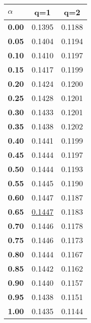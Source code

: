 \begin{tabular}{ | l || c | c |}
\hline
\textbf{$\alpha$} & \textbf{}q=1} & \textbf{}q=2} \\
\hline
\textbf{0.00} & 0.1395 & 0.1188\\
\hline
\textbf{0.05} & 0.1404 & 0.1194\\
\hline
\textbf{0.10} & 0.1410 & 0.1197\\
\hline
\textbf{0.15} & 0.1417 & 0.1199\\
\hline
\textbf{0.20} & 0.1424 & 0.1200\\
\hline
\textbf{0.25} & 0.1428 & 0.1201\\
\hline
\textbf{0.30} & 0.1433 & 0.1201\\
\hline
\textbf{0.35} & 0.1438 & 0.1202\\
\hline
\textbf{0.40} & 0.1441 & 0.1199\\
\hline
\textbf{0.45} & 0.1444 & 0.1197\\
\hline
\textbf{0.50} & 0.1444 & 0.1193\\
\hline
\textbf{0.55} & 0.1445 & 0.1190\\
\hline
\textbf{0.60} & 0.1447 & 0.1187\\
\hline
\textbf{0.65} & \underline{0.1447} & 0.1183\\
\hline
\textbf{0.70} & 0.1446 & 0.1178\\
\hline
\textbf{0.75} & 0.1446 & 0.1173\\
\hline
\textbf{0.80} & 0.1444 & 0.1167\\
\hline
\textbf{0.85} & 0.1442 & 0.1162\\
\hline
\textbf{0.90} & 0.1440 & 0.1157\\
\hline
\textbf{0.95} & 0.1438 & 0.1151\\
\hline
\textbf{1.00} & 0.1435 & 0.1144\\
\hline
\end{tabular}
